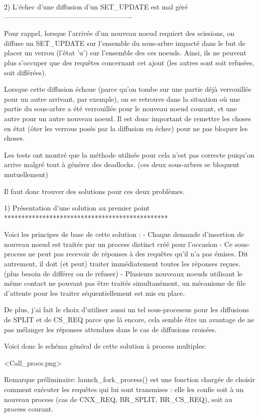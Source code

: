 2) L'échec d'une diffusion d'un SET_UPDATE est mal géré
-------------------------------------------------------

Pour rappel, lorsque l'arrivée d'un nouveau noeud requiert des scissions, on diffuse un SET_UPDATE
sur l'ensemble du sous-arbre impacté dans le but de placer un verrou (l'état 'u') sur l'ensemble des
ces noeuds. Ainsi, ils ne peuvent plus s'occuper que des requêtes concernant cet ajout (les autres
sont soit refusées, soit différées).

Lorsque cette diffusion échoue (parce qu'on tombe sur une partie déjà verrouillée pour un autre
arrivant, par exemple), on se retrouve dans la situation où une partie du sous-arbre a été
verrouillée pour le nouveau noeud courant, et une autre pour un autre nouveau noeud. Il est donc
important de remettre les choses en état (ôter les verrous posés par la diffusion en échec) pour ne
pas bloquer les choses.

Les tests ont montré que la méthode utilisée pour cela n'est pas correcte puiqu'on arrive malgré
tout à générer des deadlocks. (ces deux sous-arbres se bloquent mutuellement)


Il faut donc trouver des solutions pour ces deux problèmes.

1) Présentation d'une solution au premier point
***********************************************

Voici les principes de base de cette solution :
  - Chaque demande d'insertion de nouveau noeud est traitée par un process distinct créé pour
    l'occasion
  - Ce sous-process ne peut pas recevoir de réponses à des requêtes qu'il n'a pas émises.
    Dit autrement, il doit (et peut) traiter immédiatement toutes les réponses reçues.
    (plus besoin de différer ou de refuser)
  - Plusieurs nouveaux noeuds utilisant le même contact ne pouvant pas être traités simultanément,
    un mécanisme de file d'attente pour les traiter séquentiellement est mis en place.

De plus, j'ai fait le choix d'utiliser aussi un tel sous-processus pour les diffusions de SPLIT et
de CS_REQ parce que là encore, cela semble être un avantage de ne pas mélanger les réponses
attendues dans le cas de diffusions croisées.

Voici donc le schéma général de cette solution à process multiples:

<Call_procs.png>

Remarque préliminaire:
launch_fork_process() est une fonction chargée de choisir comment exécuter les requêtes qui lui
sont transmises : elle les confie soit à un nouveau process (cas de CNX_REQ, BR_SPLIT, BR_CS_REQ),
soit au process courant.

